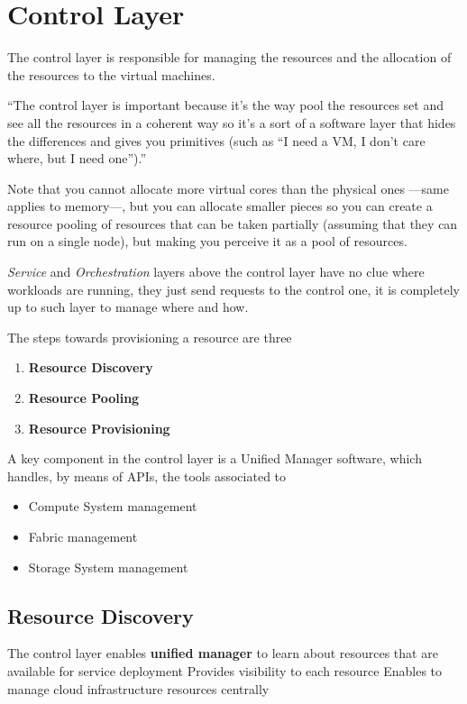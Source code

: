 \section{Control Layer}
The control layer is responsible for managing the resources and the allocation of the resources to the virtual machines.

\begin{definition}
   ``The control layer is important because it's the way pool the resources set and see all the resources in a coherent way so it's a sort of a software layer that hides the differences and gives you primitives (such as ``I need a VM, I don't care where, but I need one'').''
\end{definition}


Note that you cannot allocate more virtual cores than the physical ones ---same applies to memory---, but you can allocate smaller pieces so you can create a resource pooling of resources that can be taken partially (assuming that they can run on a single node), but making you perceive it as a pool of resources.

\textit{Service} and \textit{Orchestration} layers above the control layer have no clue where workloads are running, they just send requests to the control one, it is completely up to such layer to manage where and how. 
\nl

The steps towards provisioning a resource are three
\begin{enumerate}
   \item \textbf{Resource Discovery}
   \item \textbf{Resource Pooling}
   \item \textbf{Resource Provisioning}
\end{enumerate}

A key component in the control layer is a Unified Manager software, which handles, by means of APIs, the tools associated to
\begin{itemize}
   \item Compute System management
   \item Fabric management
   \item Storage System management
\end{itemize}

\subsection{Resource Discovery}
The control layer enables \textbf{unified manager} to learn about resources that are available for service deployment
Provides visibility to each resource
Enables to manage cloud infrastructure resources centrally


